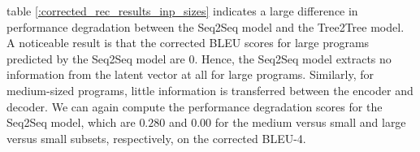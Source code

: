 \begin{table}[ht!]
\centering
\begingroup
\setlength{\tabcolsep}{3pt} %
\renewcommand{\arraystretch}{1.4} %
\endgroup
\caption{Corrected BLEU scores of reconstructed results of the best models on different input sizes. (correction scores in parenthesis)}
\label{tab:corrected_rec_results_inp_sizes}
\end{table}



table \ref{:corrected_rec_results_inp_sizes} indicates a large difference in performance degradation between the Seq2Seq model and the Tree2Tree model. A noticeable result is that the corrected BLEU scores for large programs predicted by the Seq2Seq model are 0. Hence, the Seq2Seq model extracts no information from the latent vector at all for large programs. Similarly, for medium-sized programs, little information is transferred between the encoder and decoder. We can again compute the performance degradation scores for the Seq2Seq model, which are $0.280$ and $0.00$ for the medium versus small and large versus small subsets, respectively, on the corrected BLEU-4.



